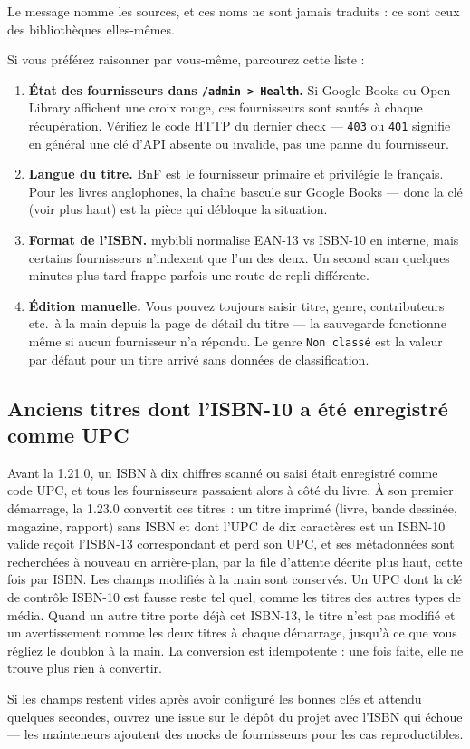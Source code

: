 Le message nomme les sources, et ces noms ne sont jamais traduits :
ce sont ceux des bibliothèques elles-mêmes.

Si vous préférez raisonner par vous-même, parcourez cette liste :

\begin{enumerate}
  \item \textbf{État des fournisseurs dans \texttt{/admin >
        Health}.} Si Google Books ou Open Library affichent une
        croix rouge, ces fournisseurs sont sautés à chaque
        récupération. Vérifiez le code HTTP du dernier check —
        \texttt{403} ou \texttt{401} signifie en général une clé
        d'API absente ou invalide, pas une panne du fournisseur.
  \item \textbf{Langue du titre.} BnF est le fournisseur primaire
        et privilégie le français. Pour les livres anglophones,
        la chaîne bascule sur Google Books — donc la clé (voir
        plus haut) est la pièce qui débloque la situation.
  \item \textbf{Format de l'ISBN.} mybibli normalise EAN-13 vs
        ISBN-10 en interne, mais certains fournisseurs n'indexent
        que l'un des deux. Un second scan quelques minutes plus
        tard frappe parfois une route de repli différente.
  \item \textbf{Édition manuelle.} Vous pouvez toujours saisir
        titre, genre, contributeurs etc.\ à la main depuis la
        page de détail du titre — la sauvegarde fonctionne même
        si aucun fournisseur n'a répondu. Le genre \texttt{Non
        classé} est la valeur par défaut pour un titre arrivé
        sans données de classification.
\end{enumerate}

\subsection*{Anciens titres dont l'ISBN-10 a été enregistré comme UPC}

Avant la 1.21.0, un ISBN à dix chiffres scanné ou saisi était
enregistré comme code UPC, et tous les fournisseurs passaient alors à
côté du livre. À son premier démarrage, la 1.23.0 convertit ces
titres : un titre imprimé (livre, bande dessinée, magazine, rapport)
sans ISBN et dont l'UPC de dix caractères est un ISBN-10 valide reçoit
l'ISBN-13 correspondant et perd son UPC, et ses métadonnées sont
recherchées à nouveau en arrière-plan, par la file d'attente décrite
plus haut, cette fois par ISBN. Les champs modifiés à la main sont
conservés. Un UPC dont la clé de contrôle ISBN-10 est fausse reste tel
quel, comme les titres des autres types de média. Quand un autre titre
porte déjà cet ISBN-13, le titre n'est pas modifié et un avertissement
nomme les deux titres à chaque démarrage, jusqu'à ce que vous régliez
le doublon à la main. La conversion est idempotente : une fois faite,
elle ne trouve plus rien à convertir.

Si les champs restent vides après avoir configuré les bonnes
clés et attendu quelques secondes, ouvrez une issue sur le dépôt
du projet avec l'ISBN qui échoue — les mainteneurs ajoutent des
mocks de fournisseurs pour les cas reproductibles.
